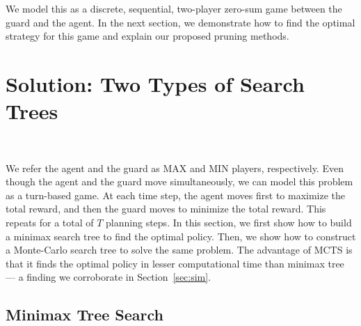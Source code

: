 \documentclass[10 pt, conference]{ieeeconf}
\newcommand{\PT}[1]{{\footnotesize\color{blue}[{\bf PT:} \textsf{#1}]}} %
\begin{document}


We model this as a discrete, sequential, two-player zero-sum game between the guard and the agent. In the next section, we demonstrate how to find the optimal strategy for this game and explain our proposed pruning methods.
%
\section{Solution: Two Types of Search Trees }~\label{sec:game}

We refer the agent and the guard as MAX and MIN players, respectively. Even though the agent and the guard move simultaneously, we can model this problem as a turn-based game. At each time step, the agent moves first to maximize the total reward, and then the guard moves to minimize the total reward. This repeats for a total of $T$ planning steps. In this section, we first show how to build a minimax search tree to find the optimal policy. Then, we show how to construct a Monte-Carlo search tree to solve the same problem. The advantage of MCTS is that it finds the optimal policy in lesser computational time than minimax tree --- a finding we corroborate in Section~\ref{sec:sim}.

\subsection{Minimax Tree Search}
\end{document}
